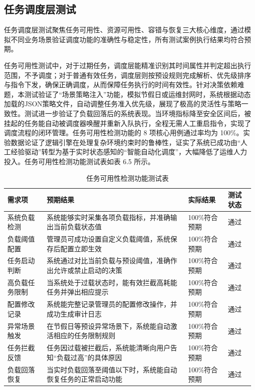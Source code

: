 \subsection{任务调度层测试}

任务调度层测试聚焦任务可用性、资源可用性、容错与恢复三大核心维度，通过模拟不同业务场景验证调度功能的准确性与稳定性，所有测试案例执行结果均符合预期。

任务可用性测试中，对于过期任务，调度层能精准识别其时间属性并判定超出执行范围，不予调度；对于普通有效任务，调度层则按预设规则完成解析、优先级排序与指令下发，确保正确调度，从而保障任务执行的时间有效性。针对决策依赖难题，本测试验证了“场景策略注入”功能，模拟节假日或运维封网时，系统根据动态加载的JSON策略文件，自动调整任务准入优先级，展现了极高的灵活性与策略一致性。测试进一步验证了负载回落后的系统表现。当环境指标降至安全区间后，被挂起的任务能自动被调度器唤醒并重新入队执行，全程无需人工重启指令，实现了调度流程的闭环管理。任务可用性检测功能的 8 项核心用例通过率均为 100\%。实验数据论证了逻辑引擎在处理复杂环境约束时的鲁棒性，证实了系统已成功由“人工经验驱动”转型为基于实时状态感知的“智能自动化调度”，大幅降低了运维人力投入。任务可用性检测功能测试表如表 6.5 所示。

\begin{table}[htbp]
\centering
\caption{任务可用性检测功能测试表}
\begin{tabularx}{\textwidth}{lXll}
\toprule
\textbf{需求项} & \textbf{预期结果} & \textbf{实际结果} & \textbf{测试状态} \\
\midrule
系统负载检测 & 系统能够实时采集各项负载指标，并准确输出当前负载状态值 & 100\%符合预期 & 通过 \\
负载阈值配置 & 管理员可成功设置自定义负载阈值，系统保存后配置立即生效 & 100\%符合预期 & 通过 \\
任务启动判断 & 系统通过对比当前负载与预设阈值，准确作出允许或禁止启动的决策 & 100\%符合预期 & 通过 \\
高负载任务限制 & 当系统处于过载状态时，能有效拦截高耗能任务并弹出相应提示 & 100\%符合预期 & 通过 \\
配置修改记录 & 系统能完整记录管理员的配置修改操作，并成功生成审计日志 & 100\%符合预期 & 通过 \\
异常场景触发 & 在节假日等预设异常场景下，系统能自动激活相应的任务限制规则 & 100\%符合预期 & 通过 \\
任务拦截反馈 & 任务因过载被拦截后，系统能清晰向用户告知“负载过高”的具体原因 & 100\%符合预期 & 通过 \\
负载回落恢复 & 当实时负载回落至阈值以下时，系统能自动恢复任务的正常启动功能 & 100\%符合预期 & 通过 \\
\bottomrule
\end{tabularx}
\label{tab:task_scheduling_test}
\end{table}

